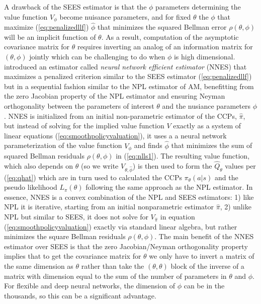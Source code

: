 A drawback of the SEES estimator is that the $\phi$ parameters determining the value function $V_\phi$ 
become nuisance parameters, and for fixed $\theta$ the 
$\phi$ that maximize (\ref{eq:penalizedllf}) $\hat\phi$ that minimizes
the squared Bellman error $\rho(\theta,\phi)$ will be an implicit function of $\theta$.
As a result, computation of the asymptotic  covariance
matrix for $\theta$ requires inverting an analog of an information matrix for $(\theta,\phi)$ jointly which can be
challenging to do when $\phi$ is high dimensional.  \citet{Nguyen:2025} introduced an estimator called
{\it neural network efficient estimator\/} (NNES) that maximizes a penalized criterion
similar to the SEES estimator (\ref{eq:penalizedllf}) but in a sequential fashion similar to the NPL
estimator of AM, benefitting from the zero Jacobian property of the NPL estimator and
ensuring Neyman orthogonality between the parameters of interest $\theta$ and the nusiance
parameters $\phi$. NNES is initialized from an initial non-parametric estimator of the CCPs, $\hat\pi$, but
instead of solving for the implied value function $V$ exactly as a system
of linear equations (\ref{eq:smoothpolicyvaluation}), it uses a 
a neural network parameterization of the value function $V_\phi$ and finds
$\hat\phi$ that minimizes
the sum of squared Bellman residuals $\rho(\theta,\phi)$ in (\ref{eq:nlls1}). The resulting value function, which
also depends on $\theta$ (so we write $V_{\theta,\hat\phi}$) is then used to form the $\hat Q_\theta$ values per (\ref{eq:qhat})
which are in turn used to calculated the CCPs
$\pi_\theta(a|s)$ and the pseudo likelihood $L_\pi(\theta)$ following the same approach as the NPL
estimator. In essence, NNES is a convex combination of the NPL and SEES estimators: 1) like NPL
it is iterative,  starting from an initial nonparametric estimator $\hat\pi$, 2) unlike NPL but similar
to SEES, it does not solve for $V_{\hat\pi}$ in equation (\ref{eq:smoothpolicyvaluation}) exactly
via standard linear algebra, but rather minimizes the square Bellman residuals $\rho(\theta,\phi)$. 
The main benefit of the NNES estimator over SEES is that the zero Jacobian/Neyman orthogonality 
property implies that to get the covariance matrix for $\theta$  we only have to invert a matrix of the
same dimension as $\theta$ rather than take the $(\theta,\theta)$ block of the inverse of a matrix
with dimension equal to the sum of the number of parameters in $\theta$ and $\phi$. For flexible
and deep neural networks, the dimension of $\phi$ can be in the thousands, so this can be a significant advantage.



